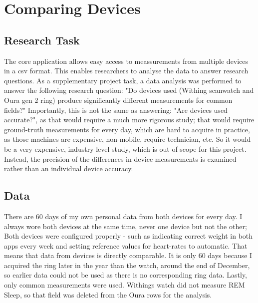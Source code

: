 \chapter{Comparing Devices}
\section{Research Task}
The core application allows easy access to meassurements from multiple devices in a csv format. This enables researchers to analyse the data to answer research questions. As a supplementary project task, a data analysis was performed to answer the following research question: "Do devices used (Withing scanwatch and Oura gen 2 ring) produce significantly different measurements for common fields?" Importantly, this is not the same as answering: "Are devices used accurate?", as that would require a much more rigorous study; that would require ground-truth measurements for every day, which are hard to acquire in practice, as those machines are expensive, non-mobile, require technician, etc. So it would be a very expensive, industry-level study, which is out of scope for this project. Instead, the precision of the differences in device measurements is examined rather than an individual device accuracy. 
\section{Data}
There are 60 days of my own personal data from both devices for every day. I always wore both devices at the same time, never one device but not the other; Both devices were configured properly - such as indicating correct weight in both apps every week and setting reference values for heart-rates to automatic. That means that data from devices is directly comparable. It is only 60 days because I acquired the ring later in the year than the watch, around the end of December, so earlier data could not be used as there is no corresponding ring data. Lastly, only common measurements were used. Withings watch did not measure REM Sleep, so that field was deleted from the Oura rows for the analysis.
